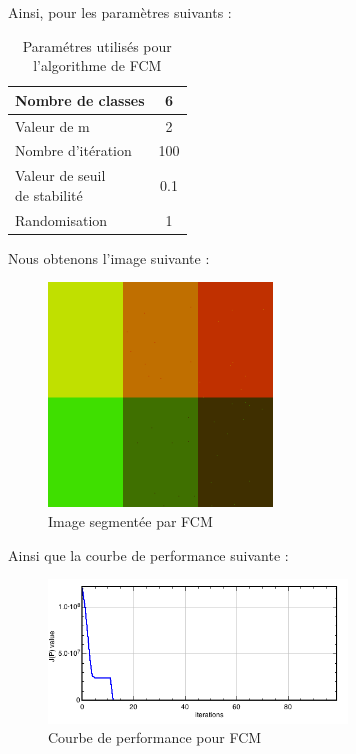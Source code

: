\documentclass[a4paper,11pt]{article}
\begin{document}
Ainsi, pour les paramètres suivants : 

\begin{table}[H]
  \begin{center}
    \begin{tabular}{|l|c|}
      \hline
      Nombre de classes & 6 \\
      \hline
      Valeur de m & 2 \\
      \hline
      Nombre d'itération & 100 \\
      \hline
      \shortstack{ Valeur de seuil \\ de stabilité }  & 0.1 \\
      \hline
      Randomisation & 1 \\
      \hline
    \end{tabular}
    \caption{Paramétres utilisés pour l'algorithme de FCM}
  \end{center}
\end{table}

Nous obtenons l'image suivante :

\begin{figure}[H]
\begin{center}
\includegraphics[width=225px]{../img/FCM.png}
\end{center}
\caption{Image segmentée par FCM}
\end{figure}

Ainsi que la courbe de performance suivante :

\begin{figure}[H]
\begin{center}
\includegraphics[width=300px]{../img/Perf_FCM.png}
\end{center}
\caption{Courbe de performance pour FCM}
\end{figure}
\end{document}
